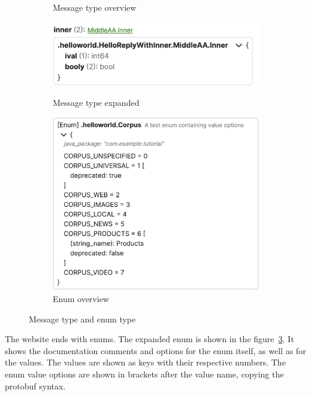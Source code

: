 \begin{figure}[!htb]
\begin{subfigure}{.5\textwidth}
        \caption{Message type overview}
        \label{fig:implementation-screenshots-message-type}
    \end{subfigure}%
    \begin{subfigure}{.5\textwidth}
        \centering
        \includegraphics[width=.95\linewidth]{images/implementation/screenshots/message-type-field-expansion}
        \caption{Message type expanded}
        \label{fig:implementation-screenshots-message-type-field-expansion}

        \includegraphics[width=0.95\linewidth]{images/implementation/screenshots/enum}
        \caption{Enum overview}
        \label{fig:implementation-screenshots-enum}
    \end{subfigure}%

    \caption{Message type and enum type}
\end{figure}

The website ends with enums.
The expanded enum is shown in the figure~\ref{fig:implementation-screenshots-enum}.
It shows the documentation comments and options for the enum itself, as well as for the values.
The values are shown as keys with their respective numbers.
The enum value options are shown in brackets after the value name, copying the protobuf syntax.

